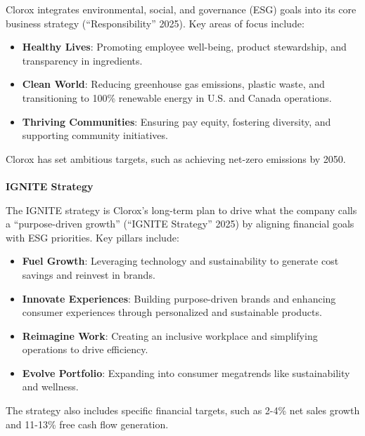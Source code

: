 \documentclass[
  letterpaper,
  DIV=11,
  numbers=noendperiod]{scrartcl}
\makeatletter
\let\oldparagraph\paragraph
\renewcommand{\paragraph}{
    \@ifstar
      \xxxParagraphStar
      \xxxParagraphNoStar
  }
\newcommand{\xxxParagraphStar}[1]{\oldparagraph*{#1}\mbox{}}
\newcommand{\xxxParagraphNoStar}[1]{\oldparagraph{#1}\mbox{}}
\providecommand{\tightlist}{%
  \setlength{\itemsep}{0pt}\setlength{\parskip}{0pt}}\usepackage{longtable,booktabs,array}
\makeatother
\begin{document}
Clorox integrates environmental, social, and governance (ESG) goals into
its core business strategy ({``Responsibility''} 2025). Key areas of
focus include:

\begin{itemize}
\tightlist
\item
  \textbf{Healthy Lives}: Promoting employee well-being, product
  stewardship, and transparency in ingredients.\\
\item
  \textbf{Clean World}: Reducing greenhouse gas emissions, plastic
  waste, and transitioning to 100\% renewable energy in U.S. and Canada
  operations.\\
\item
  \textbf{Thriving Communities}: Ensuring pay equity, fostering
  diversity, and supporting community initiatives.
\end{itemize}

Clorox has set ambitious targets, such as achieving net-zero emissions
by 2050.

\paragraph{\texorpdfstring{\textbf{IGNITE
Strategy}}{IGNITE Strategy}}\label{ignite-strategy}

The IGNITE strategy is Clorox's long-term plan to drive what the company
calls a ``purpose-driven growth'' ({``{IGNITE Strategy}''} 2025) by
aligning financial goals with ESG priorities. Key pillars include:

\begin{itemize}
\tightlist
\item
  \textbf{Fuel Growth}: Leveraging technology and sustainability to
  generate cost savings and reinvest in brands.\\
\item
  \textbf{Innovate Experiences}: Building purpose-driven brands and
  enhancing consumer experiences through personalized and sustainable
  products.\\
\item
  \textbf{Reimagine Work}: Creating an inclusive workplace and
  simplifying operations to drive efficiency.\\
\item
  \textbf{Evolve Portfolio}: Expanding into consumer megatrends like
  sustainability and wellness.
\end{itemize}

The strategy also includes specific financial targets, such as 2-4\% net
sales growth and 11-13\% free cash flow generation.
\end{document}
